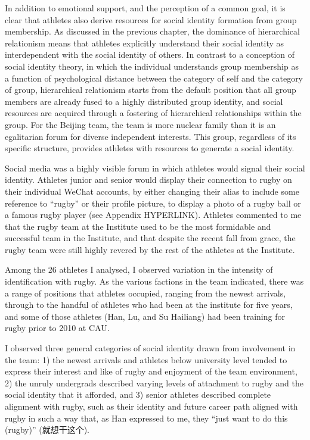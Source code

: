 \begin{CJK}{UTF8}{gbsn}
In addition to emotional support, and the perception of a common goal, it is clear that athletes also derive resources for social identity formation from group membership.    As discussed in the previous chapter, the dominance of hierarchical relationism means that athletes explicitly understand their social identity as interdependent with the social identity of others.  In contrast to a conception of social identity theory, in which the individual understands group membership as a function of psychological distance between the category of self and the category of group, hierarchical relationism starts from the default position that all group members are already fused to a highly distributed group identity, and social resources are acquired through a fostering of hierarchical relationships within the group.  For the Beijing team, the team is more nuclear family than it is an egalitarian forum for diverse independent interests.  This group, regardless of its specific structure, provides athletes with resources to generate a social identity.

Social media was a highly visible forum in which athletes would signal their social identity.  Athletes junior and senior would display their connection to rugby on their individual WeChat accounts, by either changing their alias to include some reference to ``rugby'' or their profile picture, to display a photo of a rugby ball or a famous rugby player (see Appendix HYPERLINK).  Athletes commented to me that the rugby team at the Institute used to be the most formidable and successful team in the Institute, and that despite the recent fall from grace, the rugby team were still highly revered by the rest of the athletes at the Institute.

Among the 26 athletes I analysed, I observed variation in the intensity of identification with rugby.  As the various factions in the team indicated, there was a range of positions that athletes occupied, ranging from the newest arrivals, through to the handful of athletes who had been at the institute for five years, and some of those athletes (Han, Lu, and Su Hailiang) had been training for rugby prior to 2010 at CAU.

I observed three general categories of social identity drawn from involvement in the team: 1) the newest arrivals and athletes below university level tended to express their interest and like of rugby and enjoyment of the team environment, 2) the unruly undergrads described varying levels of attachment to rugby and the social identity that it afforded, and 3) senior athletes described complete alignment with rugby, such as their identity and future career path aligned with rugby in such a way that, as Han expressed to me, they ``just want to do this (rugby)'' (就想干这个).


\end{CJK}
